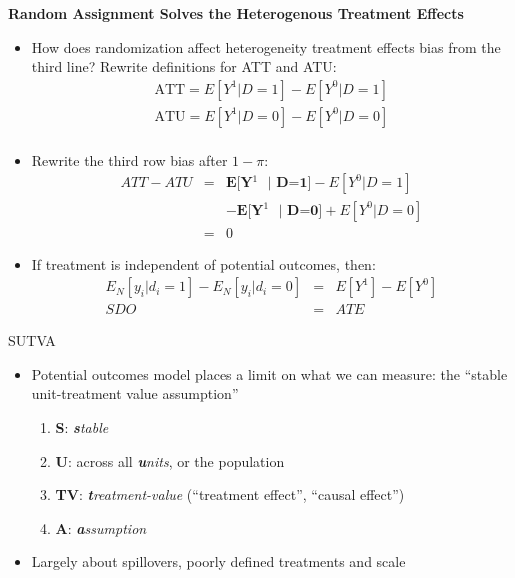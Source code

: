 \documentclass{beamer}
\begin{document}
\begin{frame}[shrink=20,plain]
  \begin{center}
    \textbf{Random Assignment Solves the Heterogenous Treatment Effects}
  \end{center}

  \begin{itemize}
    \item How does randomization affect heterogeneity treatment effects bias from the third line?  Rewrite definitions for ATT and ATU:\begin{eqnarray*}
            \text{ATT} = E[Y^1 | D=1] - E[Y^0 | D=1] \\
            \text{ATU} = E[Y^1 | D=0] - E[Y^0 | D=0] \\
          \end{eqnarray*}
    \item Rewrite the third row bias after $1-\pi$:\begin{eqnarray*}
            ATT - ATU &=& \textbf{E[Y$^1$ $|$ D=1]} - E[Y^0 | D=1] \\
            && - \textbf{E[Y$^1$ $|$ D=0]} + E[Y^0 | D=0] \\
            &=& 0
          \end{eqnarray*}
    \item If treatment is independent of potential outcomes, then:\begin{eqnarray*}
            E_N[y_i | d_i=1] - E_N[y_i | d_i=0]  &=& E[Y^1] - E[Y^0] \\
            SDO &=& ATE
          \end{eqnarray*}
  \end{itemize}
\end{frame}




\begin{frame}{SUTVA}

  \begin{itemize}
    \item Potential outcomes model places a limit on what we can measure: the ``stable unit-treatment value assumption''
          \begin{enumerate}
            \item \textbf{S}: \emph{\textbf{s}table}
            \item \textbf{U}: across all \emph{\textbf{u}nits}, or the population
            \item \textbf{TV}: \emph{\textbf{t}reatment-value} (``treatment effect'', ``causal effect'')
            \item \textbf{A}: \emph{\textbf{a}ssumption}
          \end{enumerate}
    \item Largely about spillovers, poorly defined treatments and scale
  \end{itemize}
\end{frame}
\end{document}
